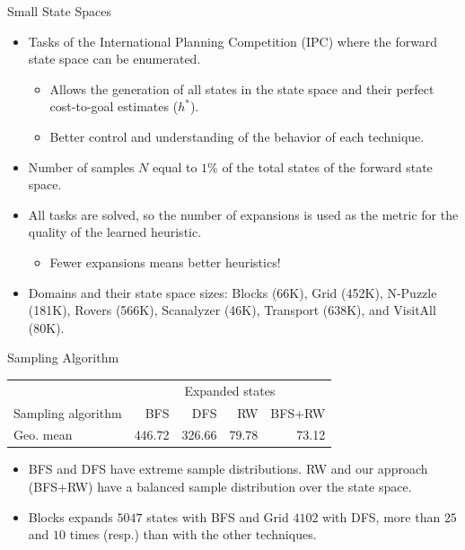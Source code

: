 \documentclass{gkibeamer}
\providecommand{\hvalue}[1]{\ensuremath{h^{#1}}\xspace}
\providecommand{\hstar}{\hvalue{*}}
\begin{document}
\begin{frame}{Small State Spaces}
\begin{itemize}
    \item Tasks of the International Planning Competition (IPC) where the forward state space can be enumerated.
    \pause
    \begin{itemize}
        \item Allows the generation of all states in the state space and their perfect cost-to-goal estimates (\hstar).
        \pause
        \item Better control and understanding of the behavior of each technique.
    \end{itemize}
    \pause
    \item Number of samples $N$ equal to $1$\% of the total states of the forward state space.
    \pause
    \item All tasks are solved, so the number of expansions is used as the metric for the quality of the learned heuristic.
    \begin{itemize}
        \item \alert{Fewer expansions} means better heuristics!
    \end{itemize}
    \pause
    \item Domains and their state space sizes: Blocks (66K), Grid (452K), N-Puzzle (181K), Rovers (566K), Scanalyzer (46K), Transport (638K), and VisitAll (80K).
\end{itemize}
\end{frame}

\begin{frame}{Sampling Algorithm} %
\begin{table}[]
\begin{tabular}{l|rrrr}
    & \multicolumn{4}{c}{Expanded states} \\
    Sampling algorithm & BFS & DFS & RW & BFS+RW \\
    \hline
    Geo. mean & 446.72 & 326.66 & 79.78 & 73.12 \\
\end{tabular}
\end{table}
\begin{itemize}
    \pause
    \item BFS and DFS have extreme sample distributions. RW and our approach (BFS+RW) have a balanced sample distribution over the state space.
    \pause
    \item Blocks expands $5047$ states with BFS and Grid $4102$ with DFS, more than $25$ and $10$ times (resp.) than with the other techniques.
\end{itemize}
\end{frame}
\end{document}

